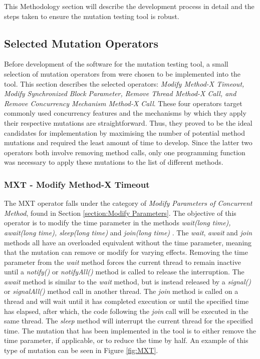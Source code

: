 \documentclass[a4paper,12pt]{article}
\begin{document}
This Methodology section will describe the development process in detail and the steps taken to ensure the mutation testing tool is robust.   


\subsection{Selected Mutation Operators}

Before development of the software for the mutation testing tool, a small selection of mutation operators from \citet{bradbury06} were chosen to be implemented into the tool. This section describes the selected operators: \textit{Modify Method-X Timeout, Modify Synchronized Block Parameter, Remove Thread Method-X Call, and Remove Concurrency Mechanism Method-X Call}. These four operators target commonly used concurrency features and the mechanisms by which they apply their respective mutations are straightforward. Thus, they proved to be the ideal candidates for implementation by maximising the number of potential method mutations and required the least amount of time to develop. Since the latter two operators both involve removing method calls, only one programming function was necessary to apply these mutations to the list of different methods.    

\subsubsection{MXT - Modify Method-X Timeout}

The MXT operator falls under the category of \textit{Modify Parameters of Concurrent Method}, found in Section \ref{section:Modify Parameters}. The objective of this operator is to modify the time parameter in the methods \textit{wait(long time), await(long time), sleep(long time)} and \textit{join(long time)} \citep{bradbury06}. The \textit{wait}, \textit{await} and \textit{join} methods all have an overloaded equivalent without the time parameter, meaning that the mutation can remove or modify for varying effects. Removing the time parameter from the \textit{wait} method forces the current thread to remain inactive until a \textit{notify()} or \textit{notifyAll()} method is called to release the interruption. The \textit{await} method is similar to the \textit{wait} method, but is instead released by a \textit{signal()} or \textit{signalAll()} method call in another thread. The \textit{join} method is called on a thread and will wait until it has completed execution or until the specified time has elapsed, after which, the code following the \textit{join} call will be executed in the same thread. The \textit{sleep} method will interrupt the current thread for the specified time. The mutation that has been implemented in the tool is to either remove the time parameter, if applicable, or to reduce the time by half. An example of this type of mutation can be seen in Figure \ref{fig:MXT}. 
\end{document}
